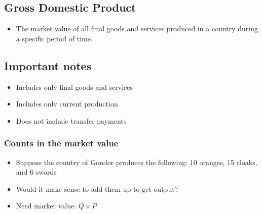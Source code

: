 \documentclass[12pt]{article} %
\begin{document}
\subsection{Gross Domestic Product}
\begin{itemize}
	\item The market value of all final goods and services produced in a country during a specific period of time.
\end{itemize}
\subsection*{Important notes}
\begin{itemize}
	\item Includes only final goods and services
	\item Includes only current production
	\item Does not include transfer payments
\end{itemize}
\subsubsection*{Counts in the market value}
\begin{itemize}
	\item{Suppose the country of Gondor produces the following: 10 oranges, 15 cloaks, and 6 swords}
	\item{Would it make sense to add them up to get output?}
	\item{Need market value: \(Q \times P\)}
\end{itemize}
\end{document}
